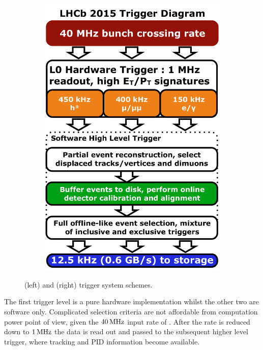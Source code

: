 \begin{figure}[t]
\begin{subfigure}{0.5\textwidth}
    \includegraphics[width=\textwidth]{Figures/Chapter2/LHCb_Trigger_RunII_May2015}
    \caption{}
    \label{det_run_two_trigger}
  \end{subfigure}
  \caption{ \runone (left) and \runtwo (right) trigger system schemes.}
  \label{det_trigger_scheams}
\end{figure}

The first trigger level is a pure hardware implementation whilst the other two are software only.
Complicated selection criteria are not affordable from computation power point of view, given the
$40{\rm \,MHz}$ input rate of \lzero. After the rate is reduced down to $1{\rm \,MHz}$ the data is read out and
passed to the subsequent higher level trigger, where tracking and PID information become available.

